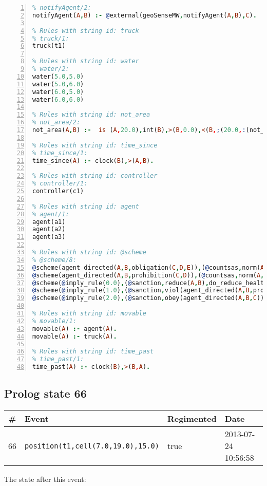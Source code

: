 \documentclass[11pt]{article}\usepackage[utf8]{inputenc}\usepackage{geometry}
\begin{document}
\begin{lstlisting}[language=Prolog, numbers=left]
% Rules with string id: notifyAgent
% notifyAgent/2:
notifyAgent(A,B) :- @external(geoSenseMW,notifyAgent(A,B),C).

% Rules with string id: truck
% truck/1:
truck(t1)

% Rules with string id: water
% water/2:
water(5.0,5.0)
water(5.0,6.0)
water(6.0,5.0)
water(6.0,6.0)

% Rules with string id: not_area
% not_area/2:
not_area(A,B) :-  is (A,20.0),int(B),>(B,0.0),<(B,;(20.0,:(not_area(A,B), is (-(B),20.0)))),int(A),>(A,0.0),<(A,;(20.0,:(area(A,B),-(int(A))))),int(B),>(A,0.0),>(B,0.0),<(A,21.0),<(B,21.0).

% Rules with string id: time_since
% time_since/1:
time_since(A) :- clock(B),>(A,B).

% Rules with string id: controller
% controller/1:
controller(c1)

% Rules with string id: agent
% agent/1:
agent(a1)
agent(a2)
agent(a3)

% Rules with string id: @scheme
% @scheme/8:
@scheme(agent_directed(A,B,obligation(C,D,E)),(@countsas,norm(A,B,F,obligation(C,D,E)),F),false,(listTrue(C)),(time_past(D)),false,[plus(viol(agent_directed(A,B,obligation(C,D,E))))|[]],[plus(obey(agent_directed(A,B,obligation(C,D,E))))|[]])
@scheme(agent_directed(A,B,prohibition(C,D)),(@countsas,norm(A,B,E,prohibition(C,D)),E),(listTrue(C)),false,(false),false,[plus(viol(agent_directed(A,B,prohibition(C,D))))|[]],[plus(obey(agent_directed(A,B,prohibition(C,D))))|[]])
@scheme(@imply_rule(0.0),(@sanction,reduce(A,B),do_reduce_health(A,B),notifyAgent(A,changed(status))),true,false,false,false,[min(reduce(A,B))|[]],[])
@scheme(@imply_rule(1.0),(@sanction,viol(agent_directed(A,B,prohibition(C,D))),do_sanction(D)),true,false,false,false,[min(viol(agent_directed(A,B,prohibition(C,D))))|[]],[])
@scheme(@imply_rule(2.0),(@sanction,obey(agent_directed(A,B,C))),true,false,false,false,[min(obey(agent_directed(A,B,C)))|[]],[])

% Rules with string id: movable
% movable/1:
movable(A) :- agent(A).
movable(A) :- truck(A).

% Rules with string id: time_past
% time_past/1:
time_past(A) :- clock(B),>(B,A).

\end{lstlisting}
\clearpage 
\subsection{Prolog state 66}
\begin{table}[ht]
\centering 
\begin{tabular}{l l l l} 
\textbf{\#} & \textbf{Event} & \textbf{Regimented} & \textbf{Date} \\ [0.5ex] 
\hline
66&\texttt{position(t1,cell(7.0,19.0),15.0)}&true&2013-07-24 10:56:58\\ [1ex] \hline\end{tabular}
\end{table}
The state after this event:
\end{document}
